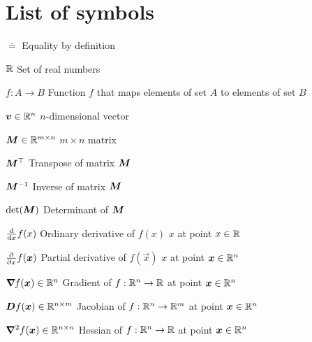 \section*{List of symbols}

\vspace{10mm}

\begin{abbrv}
    \item[$\doteq$] Equality by definition
    \item[$\mathbb{R}$] Set of real numbers
    \item[$f: A \to B$] Function $f$ that maps elements of set $A$ to elements of set $B$

    \item

    \item[$\bm{v} \in \mathbb{R}^n$] $n$-dimensional vector
    \item[$\bm{M} \in \mathbb{R}^{m\times n}$] $m \times n$ matrix
    \item[$\bm{M}^\top$] Transpose of matrix $\bm{M}$
    \item[$\bm{M}^{-1}$] Inverse of matrix $\bm{M}$
    \item[$\det{\mat{M}}$] Determinant of $\bm{M}$

    \item

    \item[$\odv*{f(x)}{x}$] Ordinary derivative of $f(x)$ \wrt $x$ at point $x\in\mathbb{R}$
    \item[$\pdv*{f(\bm{x})}{x}$] Partial derivative of $f(\vec{x})$ \wrt $x$ at point $\bm{x}\in\mathbb{R}^n$
    \item[$\bm{\nabla}_{\! } f(\bm{x}) \in \mathbb{R}^n$] Gradient of $f: \mathbb{R}^n \to \mathbb{R}$ at point $\bm{x}\in\mathbb{R}^n$
    \item[$\bm{D}_{} f(\bm{x}) \in \mathbb{R}^{n\times m}$] Jacobian of $f: \mathbb{R}^n \to \mathbb{R}^m$ at point $\bm{x}\in\mathbb{R}^n$
    \item[$\bm{\nabla}^2_{\! } f(\bm{x}) \in \mathbb{R}^{n\times n}$] Hessian of $f: \mathbb{R}^n \to \mathbb{R}$ at point $\bm{x}\in\mathbb{R}^n$
\end{abbrv}
